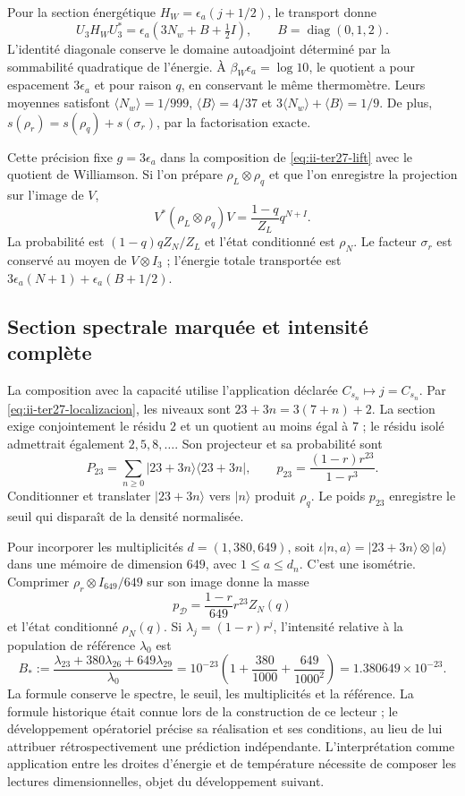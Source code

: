 Pour la section énergétique $H_W=\epsilon_a(j+1/2)$, le transport donne
\[
 U_3H_WU_3^*=\epsilon_a(3N_w+B+\tfrac12 I),
 \qquad B=\operatorname{diag}(0,1,2).
\]
L’identité diagonale conserve le domaine autoadjoint déterminé par
la sommabilité quadratique de l’énergie. À $\beta_W\epsilon_a=\log10$,
le quotient a pour espacement $3\epsilon_a$ et pour raison $q$, en conservant
le même thermomètre. Leurs moyennes satisfont
$\langle N_w\rangle=1/999$, $\langle B\rangle=4/37$ et
$3\langle N_w\rangle+\langle B\rangle=1/9$.
De plus, $s(\rho_r)=s(\rho_q)+s(\sigma_r)$, par la factorisation exacte.

Cette précision fixe $g=3\epsilon_a$ dans la composition de
\eqref{eq:ii-ter27-lift} avec le quotient de Williamson. Si l’on prépare
$\rho_L\otimes\rho_q$ et que l’on enregistre la projection sur l’image de $V$,
\[
 V^*(\rho_L\otimes\rho_q)V=\frac{1-q}{Z_L}q^{N+I}.
\]
La probabilité est $(1-q)qZ_N/Z_L$ et l’état conditionné est $\rho_N$.
Le facteur $\sigma_r$ est conservé au moyen de $V\otimes I_3$ ; l’énergie
totale transportée est
$3\epsilon_a(N+1)+\epsilon_a(B+1/2)$.

\subsection{Section spectrale marquée et intensité complète}
\label{sec:ii-ter27-marcador}

La composition avec la capacité utilise l’application déclarée
$C_{s_n}\mapsto j=C_{s_n}$. Par \eqref{eq:ii-ter27-localizacion},
les niveaux sont $23+3n=3(7+n)+2$. La section exige conjointement le
résidu $2$ et un quotient au moins égal à $7$ ; le résidu isolé admettrait également
$2,5,8,\ldots$. Son projecteur et sa probabilité sont
\[
 P_{23}=\sum_{n\geq0}|23+3n\rangle\langle23+3n|,
 \qquad p_{23}=\frac{(1-r)r^{23}}{1-r^3}.
\]
Conditionner et translater $|23+3n\rangle$ vers $|n\rangle$ produit $\rho_q$.
Le poids $p_{23}$ enregistre le seuil qui disparaît de la densité normalisée.

Pour incorporer les multiplicités $d=(1,380,649)$, soit
$\iota|n,a\rangle=|23+3n\rangle\otimes|a\rangle$ dans une mémoire
de dimension $649$, avec $1\leq a\leq d_n$. C’est une isométrie.
Comprimer $\rho_r\otimes I_{649}/649$ sur son image donne la masse
\[
 p_{\mathcal D}=\frac{1-r}{649}r^{23}Z_N(q)
\]
et l’état conditionné $\rho_N(q)$. Si $\lambda_j=(1-r)r^j$,
l’intensité relative à la population de référence $\lambda_0$ est
\begin{equation}
 B_*:=\frac{\lambda_{23}+380\lambda_{26}+649\lambda_{29}}{\lambda_0}
 =10^{-23}\left(1+\frac{380}{1000}+\frac{649}{1000^2}\right)
 =1.380649\times10^{-23}.
 \label{eq:ii-ter27-intensidad}
\end{equation}
La formule conserve le spectre, le seuil, les multiplicités et la référence.
La formule historique était connue lors de la construction de ce lecteur ;
le développement opératoriel précise sa réalisation et ses conditions, au
lieu de lui attribuer rétrospectivement une prédiction indépendante.
L’interprétation comme application entre les droites d’énergie et de température
nécessite de composer les lectures dimensionnelles, objet du développement suivant.

